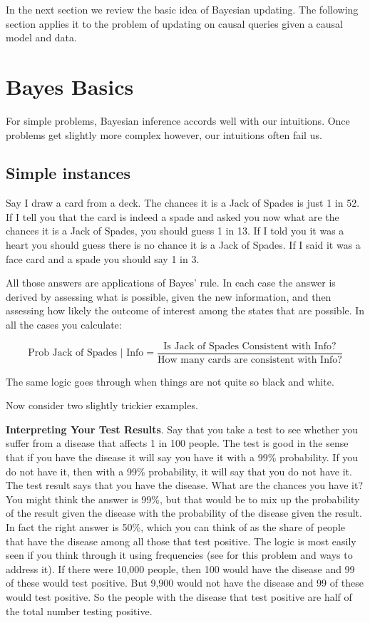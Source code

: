 \documentclass[
  12pt,
]{book}
\begin{document}
In the next section we review the basic idea of Bayesian updating. The following section applies it to the problem of updating on causal queries given a causal model and data.

\hypertarget{bayes-basics}{%
\section{Bayes Basics}\label{bayes-basics}}

For simple problems, Bayesian inference accords well with our intuitions. Once problems get slightly more complex however, our intuitions often fail us.

\hypertarget{simple-instances}{%
\subsection{Simple instances}\label{simple-instances}}

Say I draw a card from a deck. The chances it is a Jack of Spades is just 1 in 52. If I tell you that the card is indeed a spade and asked you now what are the chances it is a Jack of Spades, you should guess 1 in 13. If I told you it was a heart you should guess there is no chance it is a Jack of Spades. If I said it was a face card and a spade you should say 1 in 3.

All those answers are applications of Bayes' rule. In each case the answer is derived by assessing what is possible, given the new information, and then assessing how likely the outcome of interest among the states that are possible. In all the cases you calculate:

\[\text{Prob Jack of Spades | Info} = \frac{\text{Is Jack of Spades Consistent with Info?}}{\text{How many cards are consistent with Info?}}\]

The same logic goes through when things are not quite so black and white.

Now consider two slightly trickier examples.

\textbf{Interpreting Your Test Results}. Say that you take a test to see whether you suffer from a disease that affects 1 in 100 people. The test is good in the sense that if you have the disease it will say you have it with a 99\% probability. If you do not have it, then with a 99\% probability, it will say that you do not have it. The test result says that you have the disease. What are the chances you have it? You might think the answer is 99\%, but that would be to mix up the probability of the result given the disease with the probability of the disease given the result. In fact the right answer is 50\%, which you can think of as the share of people that have the disease among all those that test positive. The logic is most easily seen if you think through it using frequencies (see \citet{hoffrage1998using} for this problem and ways to address it). If there were 10,000 people, then 100 would have the disease and 99 of these would test positive. But 9,900 would not have the disease and 99 of these would test positive. So the people with the disease that test positive are half of the total number testing positive.
\end{document}
